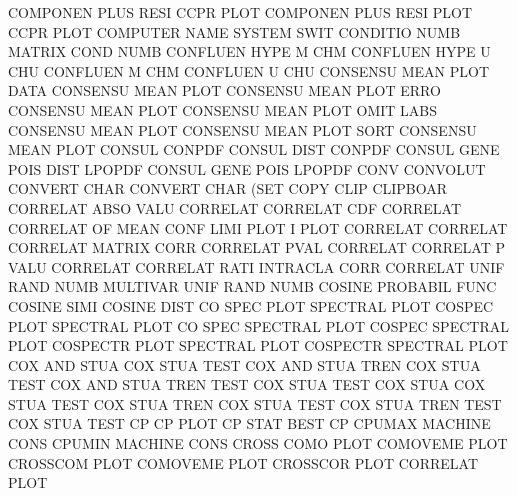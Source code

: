 COMPONEN PLUS RESI                      CCPR     PLOT
COMPONEN PLUS RESI PLOT                 CCPR     PLOT
COMPUTER NAME                           SYSTEM   SWIT
CONDITIO NUMB                           MATRIX   COND NUMB
CONFLUEN HYPE M                         CHM
CONFLUEN HYPE U                         CHU
CONFLUEN M                              CHM
CONFLUEN U                              CHU
CONSENSU MEAN PLOT DATA                 CONSENSU MEAN PLOT
CONSENSU MEAN PLOT ERRO                 CONSENSU MEAN PLOT
CONSENSU MEAN PLOT OMIT LABS            CONSENSU MEAN PLOT
CONSENSU MEAN PLOT SORT                 CONSENSU MEAN PLOT
CONSUL                                  CONPDF
CONSUL   DIST                           CONPDF
CONSUL   GENE POIS DIST                 LPOPDF
CONSUL   GENE POIS                      LPOPDF
CONV                                    CONVOLUT
CONVERT  CHAR                           CONVERT  CHAR (SET
COPY     CLIP                           CLIPBOAR
CORRELAT ABSO VALU                      CORRELAT
CORRELAT CDF                            CORRELAT
CORRELAT OF   MEAN CONF LIMI PLOT       I        PLOT
CORRELAT                                CORRELAT
CORRELAT                                MATRIX   CORR
CORRELAT PVAL                           CORRELAT
CORRELAT P    VALU                      CORRELAT
CORRELAT RATI                           INTRACLA CORR
CORRELAT UNIF RAND NUMB                 MULTIVAR UNIF RAND NUMB
COSINE                                  PROBABIL FUNC
COSINE   SIMI                           COSINE   DIST
CO       SPEC PLOT                      SPECTRAL PLOT
COSPEC   PLOT                           SPECTRAL PLOT
CO       SPEC                           SPECTRAL PLOT
COSPEC                                  SPECTRAL PLOT
COSPECTR PLOT                           SPECTRAL PLOT
COSPECTR                                SPECTRAL PLOT
COX      AND  STUA                      COX      STUA TEST
COX      AND  STUA TREN                 COX      STUA TEST
COX      AND  STUA TREN TEST            COX      STUA TEST
COX      STUA                           COX      STUA TEST
COX      STUA TREN                      COX      STUA TEST
COX      STUA TREN TEST                 COX      STUA TEST
CP                                      CP       PLOT
CP       STAT                           BEST     CP
CPUMAX                                  MACHINE  CONS
CPUMIN                                  MACHINE  CONS
CROSS    COMO PLOT                      COMOVEME PLOT
CROSSCOM PLOT                           COMOVEME PLOT
CROSSCOR PLOT                           CORRELAT PLOT
